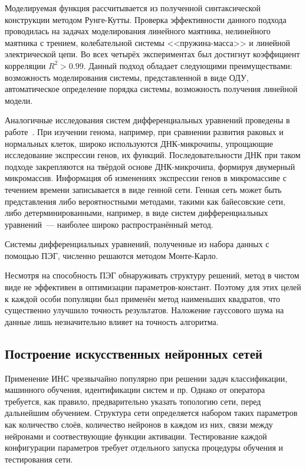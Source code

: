 Моделируемая функция рассчитывается из полученной синтаксической конструкции методом Рунге-Кутты. Проверка эффективности данного подхода проводилась на задачах моделирования линейного маятника, нелинейного маятника с трением, колебательной системы <<пружина-масса>> и линейной электрической цепи. Во всех четырёх экспериментах был достигнут коэффициент корреляции $R^2 > 0.99$. Данный подход обладает следующими преимуществами: возможность моделирования системы, представленной в виде ОДУ, автоматическое определение порядка системы, возможность получения линейной модели.

Аналогичные исследования систем дифференциальных уравнений проведены в работе~\cite{conf/acsc/ZarnegarVS09}. При изучении генома, например, при сравнении развития раковых и нормальных клеток, широко используются ДНК-микрочипы, упрощающие исследование экспрессии генов, их функций. Последовательности ДНК при таком подходе закрепляются на твёрдой основе ДНК-микрочипа, формируя двумерный микромассив. Информация об изменениях экспрессии генов в микромассиве с течением времени записывается в виде генной сети. Генная сеть может быть представления либо вероятностными методами, такими как байесовские сети, либо детерминированными, например, в виде систем дифференциальных уравнений~--- наиболее широко распространённый метод.

Системы дифференциальных уравнений, полученные из набора данных с помощью ПЭГ, численно решаются методом Монте-Карло.

Несмотря на способность ПЭГ обнаруживать структуру решений, метод в чистом виде не эффективен в оптимизации параметров-констант. Поэтому для этих целей к каждой особи популяции был применён метод наименьших квадратов, что существенно улучшило точность результатов. Наложение гауссового шума на данные лишь незначительно влияет на точность алгоритма.


\subsection{Построение искусственных нейронных сетей}

Применение ИНС чрезвычайно популярно при решении задач классификации, машинного обучения, идентификации систем и пр. Однако от оператора требуется, как правило, предварительно указать топологию сети, перед дальнейшим обучением. Структура сети определяется набором таких параметров как количество слоёв, количество нейронов в каждом из них, связи между нейронами и соотвествующие функции активации. Тестирование каждой конфигурации параметров требует отдельного запуска процедуры обучения и тестирования сети.

